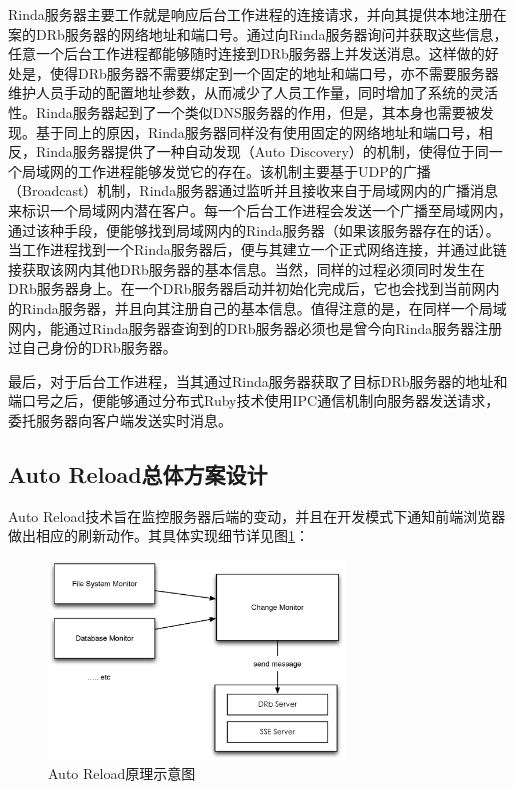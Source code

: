 Rinda服务器主要工作就是响应后台工作进程的连接请求，并向其提供本地注册在案的DRb服务器的网络地址和端口号。通过向Rinda服务器询问并获取这些信息，任意一个后台工作进程都能够随时连接到DRb服务器上并发送消息。这样做的好处是，使得DRb服务器不需要绑定到一个固定的地址和端口号，亦不需要服务器维护人员手动的配置地址参数，从而减少了人员工作量，同时增加了系统的灵活性。Rinda服务器起到了一个类似DNS服务器的作用，但是，其本身也需要被发现。基于同上的原因，Rinda服务器同样没有使用固定的网络地址和端口号，相反，Rinda服务器提供了一种自动发现（Auto Discovery）的机制，使得位于同一个局域网的工作进程能够发觉它的存在。该机制主要基于UDP的广播（Broadcast）机制，Rinda服务器通过监听并且接收来自于局域网内的广播消息来标识一个局域网内潜在客户。每一个后台工作进程会发送一个广播至局域网内，通过该种手段，便能够找到局域网内的Rinda服务器（如果该服务器存在的话）。当工作进程找到一个Rinda服务器后，便与其建立一个正式网络连接，并通过此链接获取该网内其他DRb服务器的基本信息。当然，同样的过程必须同时发生在DRb服务器身上。在一个DRb服务器启动并初始化完成后，它也会找到当前网内的Rinda服务器，并且向其注册自己的基本信息。值得注意的是，在同样一个局域网内，能通过Rinda服务器查询到的DRb服务器必须也是曾今向Rinda服务器注册过自己身份的DRb服务器。

最后，对于后台工作进程，当其通过Rinda服务器获取了目标DRb服务器的地址和端口号之后，便能够通过分布式Ruby技术使用IPC通信机制向服务器发送请求，委托服务器向客户端发送实时消息。


\subsection{Auto Reload总体方案设计}

Auto Reload技术旨在监控服务器后端的变动，并且在开发模式下通知前端浏览器做出相应的刷新动作。其具体实现细节详见图\ref{fig-reload}：

\begin{figure}[h]
\centering
\includegraphics[width=0.7\textwidth]{images/overview/auto_reload.eps}
\caption{Auto Reload原理示意图}
\label{fig-reload}
\end{figure}

